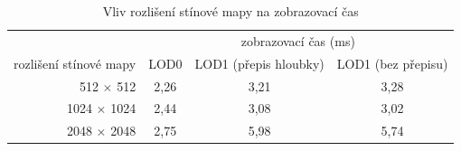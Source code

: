 %
\begin{table}[here]
\centering
\begin{tabular}{|r | c | c | c |} 
\hline 
&\multicolumn{3}{|c|}{zobrazovací čas (ms)}\\
rozlišení stínové mapy			&LOD0		&LOD1 (přepis hloubky)	&LOD1 (bez přepisu)\\
\hline					
512 $\times$ 512		&2,26	&3,21	&3,28 \\
1024 $\times$ 1024	&2,44	&3,08	&3,02\\ 
2048 $\times$ 2048	&2,75	&5,98	&5,74\\
[1ex] 
\hline 
\end{tabular}
\label{table:lod01-shadow}
\caption{Vliv rozlišení stínové mapy na zobrazovací čas}
\end{table}